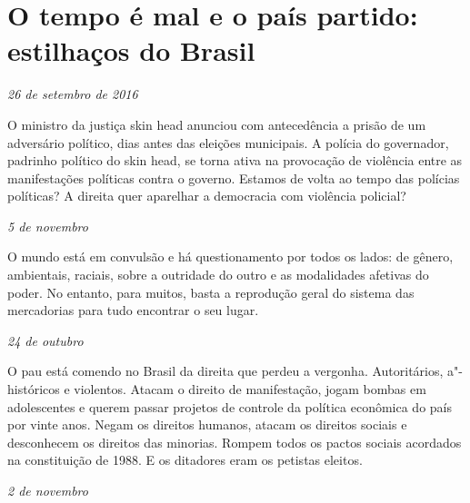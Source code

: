 \chapter{O tempo é mal e o país partido: estilhaços do Brasil}

\begin{flushright}
\emph{26 de setembro de 2016}
\end{flushright}

O ministro da justiça skin head anunciou com antecedência a prisão de um
adversário político, dias antes das eleições municipais. A polícia do
governador, padrinho político do skin head, se torna ativa na provocação
de violência entre as manifestações políticas contra o governo. Estamos
de volta ao tempo das polícias políticas? A direita quer aparelhar a
democracia com violência policial?

\begin{flushright}
\emph{5 de novembro}
\end{flushright}

O mundo está em convulsão e há questionamento por todos os lados: de
gênero, ambientais, raciais, sobre a outridade do outro e as modalidades
afetivas do poder. No entanto, para muitos, basta a reprodução geral do
sistema das mercadorias para tudo encontrar o seu lugar.

\pagebreak

\begin{flushright}
\emph{24 de outubro}
\end{flushright}

O pau está comendo no Brasil da direita que perdeu a vergonha.
Autoritários, a"-históricos e violentos. Atacam o direito de
manifestação, jogam bombas em adolescentes e querem passar projetos de
controle da política econômica do país por vinte anos. Negam os direitos
humanos, atacam os direitos sociais e desconhecem os direitos das
minorias. Rompem todos os pactos sociais acordados na constituição de
1988. E os ditadores eram os petistas eleitos.

\begin{flushright}
\emph{2 de novembro}
\end{flushright}

